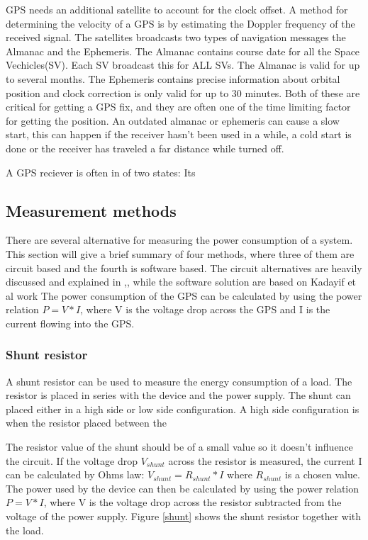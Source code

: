   GPS needs an additional satellite to account for the clock offset. A method for determining the velocity of a GPS is by estimating the Doppler frequency of the received signal. The satellites broadcasts two types of navigation messages the Almanac and the Ephemeris. The Almanac contains course date for all the Space Vechicles(SV). Each SV broadcast this for ALL SVs. The Almanac is valid for up to several months. The Ephemeris contains precise information about orbital position and clock correction is only valid for up to 30 minutes. Both of these are critical for getting a GPS fix, and they are often one of the time limiting factor for getting the position. 
  An outdated almanac or ephemeris can cause a slow start, this can happen if the receiver hasn't been used in a while, a cold start is done or the receiver has traveled a far distance while turned off.
  
  A GPS reciever is often in of two states: Its

\subsection{Measurement methods}

There are several alternative for measuring the power consumption of a system. This section will give a brief summary of four methods, where three of them are circuit based and the fourth is software based. The circuit alternatives are heavily discussed and explained in \cite{Intersil},\cite{Infineon}, while the software solution are based on Kadayif et al work 
The power consumption of the GPS can be calculated by using the power relation $P=V*I$, where V is the voltage drop across the GPS and I is the current flowing into the GPS. 

\subsubsection{Shunt resistor}
A shunt resistor can be used to measure the energy consumption of a load. The resistor is placed in series with the device and the power supply. The shunt can placed either in a high side or low side configuration. A high side configuration is when the resistor placed between the 


The resistor value of the shunt should be of a small value so it doesn't influence the circuit. If the voltage drop $V_{shunt}$ across the resistor is measured, the current I can be calculated by Ohms law: $V_{shunt}=R_{shunt}*I$  where $R_{shunt}$ is a chosen value. The power used by the device can then be calculated by using the power relation $P=V*I$, where V is the voltage drop across the resistor subtracted from the voltage of the power supply. Figure \ref{shunt} shows the shunt resistor together with the load. 


